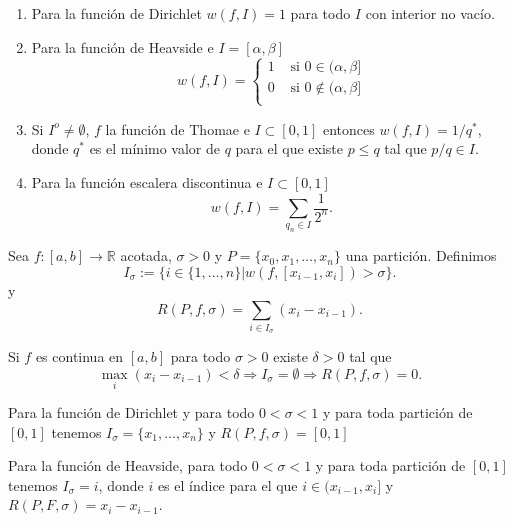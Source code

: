 \begin{ejemplo}{} 
\begin{enumerate}
 \item Para la función de Dirichlet $w(f,I)=1$ para todo $I$ con interior no vacío.
 \item Para la función de Heavside e $I=[\alpha,\beta]$
 \[
  w(f,I)=\begin{cases}
          1 & \text{ si } 0\in (\alpha,\beta]\\
          0 & \text{ si } 0\notin (\alpha,\beta]\\
         \end{cases}
 \]
  \item Si $I^o\neq\emptyset$, $f$ la función de Thomae e $I\subset [0,1]$ entonces 
     $ w(f,I)=1/q^*$, donde $q^*$ es el mínimo valor de $q$ para el que existe $p\leq q$ tal que $p/q\in I$.
  \item Para la función escalera discontinua e $I\subset [0,1]$
  \[
   w(f,I)=\sum_{q_n\in I}\frac{1}{2^n}.
  \]
\end{enumerate}

 
\end{ejemplo}



\begin{definicion}{} Sea $f:[a,b]\to\mathbb{R}$ acotada, $\sigma>0$ y $P=\{x_0,x_1,\ldots,x_n\}$ una partición. Definimos
\[
 I_{\sigma}:=\{i\in\{1,\ldots,n\}|w(f,[x_{i-1},x_i])>\sigma\}.
\]
y
\[
 R(P,f,\sigma)=\sum_{i\in I_{\sigma}}(x_i-x_{i-1}).
\]
\end{definicion}





\begin{proposicion} Si $f$ es continua en $[a,b]$ para todo $\sigma>0$ existe $\delta>0$ tal que 
\[
\max_i(x_i-x_{i-1})<\delta\Rightarrow I_{\sigma}=\emptyset\Rightarrow R(P,f,\sigma)=0. 
\]

 
\end{proposicion}

\begin{ejemplo}{} Para la función de Dirichlet y para todo $0<\sigma<1$ y para toda partición de $[0,1]$ tenemos $I_{\sigma}=\{x_1,\ldots,x_n\}$ y $R(P,f,\sigma)=[0,1]$
 
\end{ejemplo}

\begin{ejemplo}{} Para la función de Heavside,   para todo $0<\sigma<1$ y para toda partición de $[0,1]$ tenemos $I_{\sigma}=i$, donde $i$ es el índice para el que $i\in (x_{i-1},x_i]$ y $R(P,F,\sigma)=x_i-x_{i-1}$.
 
\end{ejemplo}

